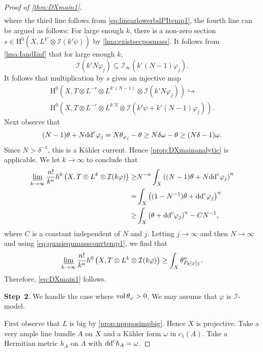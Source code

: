 \begin{proof}[Proof of \cref{thm:DXmain1}]
\[\begin{aligned}
        \end{aligned}
    \]
    where the third line follows from \eqref{eq:linearlowerbdPItemp1}, the fourth line can be argued as follows: For large enough $k$, there is a non-zero section $s\in \mathrm{H}^0(X,L^{k'}\otimes \mathcal{I}(k'\psi))$ by \cref{lma:existsecposmass}. It follows from \cref{lma:IandIinf} that for large enough $k$,
    \[
        \mathcal{I}\left(k'N\varphi_j\right)\subseteq \mathcal{I}_{\infty}\left(k'(N-1)\varphi_j\right).
    \]
    It follows that multiplication by $s$ gives an injective map
    \[
        \begin{split}
            \mathrm{H}^0\left(X,T\otimes L^{-r}\otimes L^{k'(N-1)}\otimes \mathcal{I}\left(k'N\varphi_j\right)\right)\hookrightarrow \\
            \mathrm{H}^0\left(X,T\otimes L^{-r}\otimes L^{k'N}\otimes \mathcal{I}\left(k'\psi+k'(N-1)\varphi_j\right)\right).
        \end{split}
    \]
    Next observe that
\[
    (N-1)\theta+N\mathrm{dd}^{\mathrm{c}}\varphi_j= N\theta_{\varphi_j}-\theta \geq N\delta\omega-\theta \geq (N\delta-1)\omega.
\]
Since $N>\delta^{-1}$, this is a Kähler current. Hence \cref{prop:DXmainanalytic} is applicable. We let $k\to\infty$ to conclude that
    \[
        \begin{aligned}
        \varliminf_{k\to\infty}\frac{n!}{k^n}h^0\left(X,T\otimes L^{k}\otimes \mathcal{I}(k\varphi)\right)
        \geq & N^{-n}\int_{X} \left( (N-1)\theta+N\mathrm{dd}^{\mathrm{c}} \varphi_j\right)^n\\
        =& \int_X \left((1-N^{-1})\theta+\mathrm{dd}^{\mathrm{c}}\varphi_j \right)^n\\
        \geq & \int_X \left(\theta+\mathrm{dd}^{\mathrm{c}}\varphi_j \right)^n -C N^{-1},
        \end{aligned}
    \]
    where $C$ is a constant independent of $N$ and $j$.
    Letting $j\to\infty$ and then $N\to\infty$ and using \eqref{eq:quasiequmassconvtemp1}, we find that
    \[
        \varliminf_{k\to\infty}\frac{n!}{k^n}h^0\left(X,T\otimes L^{k}\otimes \mathcal{I}(k\varphi)\right)\geq \int_X \theta_{P_{\theta}[\varphi]_{\mathcal{I}}}^n.
    \]
    Therefore, \eqref{eq:DXmain1} follows.

    \textbf{Step~2}. We handle the case where $\operatorname{vol} \theta_{\varphi}>0$. We may assume that $\varphi$ is $\mathcal{I}$-model.

    First observe that $L$ is big by \cref{prop:nppposimpbig}. Hence $X$ is projective.
    Take a very ample line bundle $A$ on $X$ and a Kähler form $\omega$ in $c_1(A)$. Take a Hermitian metric $h_A$ on $A$ with $\mathrm{dd}^{\mathrm{c}} h_A=\omega$.


\end{proof}
